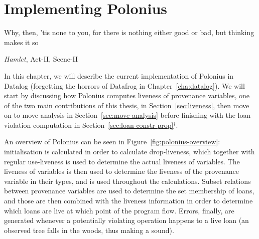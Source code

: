 \documentclass[11pt,a4paper,twoside,openany,draft]{report}
\newcommand{\notmine}[0] {$^\dagger$}
\begin{document}
\chapter{Implementing Polonius}\label{cha:implementation}

\epigraph{Why, then, 'tis none to you, for there is nothing either good or bad,
  but thinking makes it so}%
{\textit{Hamlet}, Act-II, Scene-II}

In this chapter, we will describe the current implementation of Polonius in
Datalog (forgetting the horrors of Datafrog in Chapter~\ref{cha:datalog}). We
will start by discussing how Polonius computes liveness of provenance variables,
one of the two main contributions of this thesis, in Section~\ref{sec:liveness},
then move on to move analysis in Section~\ref{sec:move-analysis} before
finishing with the loan violation computation in
Section~\ref{sec:loan-constr-prop}\notmine{}.

An overview of Polonius can be seen in Figure~\ref{fig:polonius-overview}:
initialisation is calculated in order to calculate drop-liveness, which together
with regular use-liveness is used to determine the actual liveness of variables.
The liveness of variables is then used to determine the liveness of the
provenance variable in their types, and is used throughout the calculations.
Subset relations between provenance variables are used to determine the set
membership of loans, and those are then combined with the liveness information
in order to determine which loans are live at which point of the program flow.
Errors, finally, are generated whenever a potentially violating operation
happens to a live loan (an observed tree falls in the woods, thus making a
sound).
\end{document}
